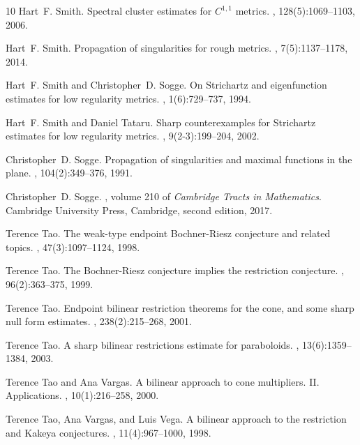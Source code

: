 \documentclass{amsart}
\numberwithin{equation}{section}
\theoremstyle{definition}
\begin{document}
\begin{thebibliography}{10}
Hart~F. Smith.
\newblock Spectral cluster estimates for {$C^{1,1}$} metrics.
, 128(5):1069--1103, 2006.

Hart~F. Smith.
\newblock Propagation of singularities for rough metrics.
, 7(5):1137--1178, 2014.

Hart~F. Smith and Christopher~D. Sogge.
\newblock On {S}trichartz and eigenfunction estimates for low regularity
  metrics.
, 1(6):729--737, 1994.

Hart~F. Smith and Daniel Tataru.
\newblock Sharp counterexamples for {S}trichartz estimates for low regularity
  metrics.
, 9(2-3):199--204, 2002.

Christopher~D. Sogge.
\newblock Propagation of singularities and maximal functions in the plane.
, 104(2):349--376, 1991.

Christopher~D. Sogge.
, volume 210 of {\em
  Cambridge Tracts in Mathematics}.
\newblock Cambridge University Press, Cambridge, second edition, 2017.

Terence Tao.
\newblock The weak-type endpoint {B}ochner-{R}iesz conjecture and related
  topics.
, 47(3):1097--1124, 1998.

Terence Tao.
\newblock The {B}ochner-{R}iesz conjecture implies the restriction conjecture.
, 96(2):363--375, 1999.

Terence Tao.
\newblock Endpoint bilinear restriction theorems for the cone, and some sharp
  null form estimates.
, 238(2):215--268, 2001.

Terence Tao.
\newblock A sharp bilinear restrictions estimate for paraboloids.
, 13(6):1359--1384, 2003.

Terence Tao and Ana Vargas.
\newblock A bilinear approach to cone multipliers. {II}. {A}pplications.
, 10(1):216--258, 2000.

Terence Tao, Ana Vargas, and Luis Vega.
\newblock A bilinear approach to the restriction and {K}akeya conjectures.
, 11(4):967--1000, 1998.


\end{thebibliography}
\end{document}
